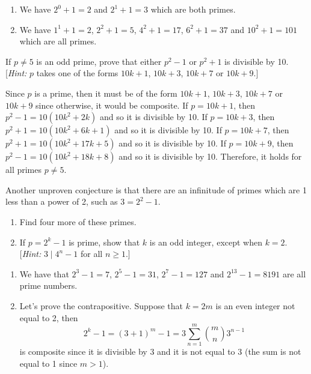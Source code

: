 \begin{solution}
    \begin{enumerate}
        \item We have $2^0 + 1 = 2$ and $2^1 + 1 = 3$ which are both primes.
        \item We have $1^1 + 1 = 2$, $2^2 + 1 = 5$, $4^2 + 1 = 17$, $6^2 + 1 = 37$ and $10^2 + 1 = 101$ which are all primes.
    \end{enumerate}
\end{solution}

\begin{exercise}
    If $p \neq 5$ is an odd prime, prove that either $p^2-1$ or $p^2 + 1$ is divisible by 10. [\textit{Hint:} $p$ takes one of the forms $10k + 1$, $10k+3$, $10k + 7$ or $10k + 9$.] \\
\end{exercise}

\begin{solution}
    Since $p$ is a prime, then it must be of the form $10k + 1$,  $10k+3$, $10k + 7$ or $10k + 9$ since otherwise, it would be composite. If $p = 10k + 1$, then $p^2 - 1 = 10(10k^2 + 2k)$ and so it is divisible by 10. If $p = 10k + 3$, then $p^2 + 1 = 10(10k^2 + 6k + 1)$ and so it is divisible by 10. If $p = 10k + 7$, then $p^2 + 1 = 10(10k^2 + 17k + 5)$ and so it is divisible by 10. If $p = 10k + 9$, then $p^2 - 1 = 10(10k^2 + 18k + 8)$ and so it is divisible by 10. Therefore, it holds for all primes $p \neq 5$. \\
\end{solution}

\begin{exercise}
    Another unproven conjecture is that there are an infinitude of primes which are 1 less than a power of 2, such as $3 = 2^2 - 1$.
    \begin{enumerate}
        \item Find four more of these primes.
        \item If $p = 2^k - 1$ is prime, show that $k$ is an odd integer, except when $k = 2$. [\textit{Hint:} $3 \mid 4^n - 1$ for all $n \geq 1$.]
    \end{enumerate}
\end{exercise}

\begin{solution}
    \begin{enumerate}
        \item We have that $2^3 - 1 = 7$, $2^5 - 1 = 31$, $2^7 - 1 = 127$ and $2^{13} - 1 = 8191$ are all prime numbers.
        \item Let's prove the contrapositive. Suppose that $k = 2m$ is an even integer not equal to 2, then 
        $$2^k - 1 = (3 + 1)^m - 1 = 3\sum_{n=1}^{m}\binom{m}{n}3^{n-1}$$
        is composite since it is divisible by 3 and it is not equal to 3 (the sum is not equal to 1 since $m > 1$).
    \end{enumerate}
\end{solution}

